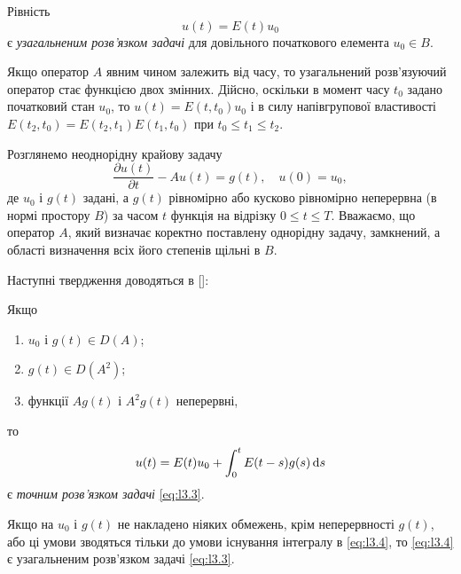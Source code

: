 \begin{definition}
    Рівність 
    \begin{equation*}
        u(t) = E(t) u_0
    \end{equation*}
    є \textit{узагальненим розв'язком задачі} для довільного початкового елемента $u_0 \in B$.
\end{definition}

Якщо оператор $A$ явним чином залежить від часу, то узагальнений розв'язуючий оператор стає функцією двох змінних. Дійсно, оскільки в момент часу $t_0$ задано початковий стан $u_0$, то $u(t) = E(t, t_0) u_0$ і в силу напівгрупової властивості $E(t_2, t_0) = E(t_2, t_1) E(t_1, t_0)$ при $t_0 \le t_1 \le t_2$. \medskip

Розглянемо неоднорідну крайову задачу
\begin{equation}
    \label{eq:l3.3}
    \frac{\partial u(t)}{\partial t} - A u(t) = g(t), \quad u(0) = u_0,
\end{equation}
де $u_0$ і $g(t)$ задані, а $g(t)$ рівномірно або кусково рівномірно неперервна (в  нормі простору $B$) за часом $t$ функція на відрізку $0 \le t \le T$. Вважаємо, що оператор $A$, який визначає коректно поставлену однорідну задачу, замкнений, а області визначення всіх його степенів щільні в $B$. \medskip

Наступні твердження доводяться в []:
\begin{proposition}
    Якщо 
    \begin{enumerate}
        \item $u_0$ і $g(t) \in D(A)$; 
        \item $g(t) \in D(A^2)$; 
        \item функції $A g(t)$ і $A^2 g(t)$ неперервні,
    \end{enumerate}
    то 
    \begin{equation}
        \label{eq:l3.4}
        u(t) = E(t) u_0 + \int_0^t E(t - s) g(s) \mathop{}\!\mathrm{d} s
    \end{equation}
    є \textit{точним розв'язком задачі} \eqref{eq:l3.3}.
\end{proposition}

\begin{proposition}
    Якщо на $u_0$ і $g(t)$  не накладено ніяких обмежень, крім неперервності $g(t)$, або ці умови зводяться тільки до умови існування інтегралу в \eqref{eq:l3.4}, то \eqref{eq:l3.4} є узагальненим розв'язком задачі \eqref{eq:l3.3}.
\end{proposition}

